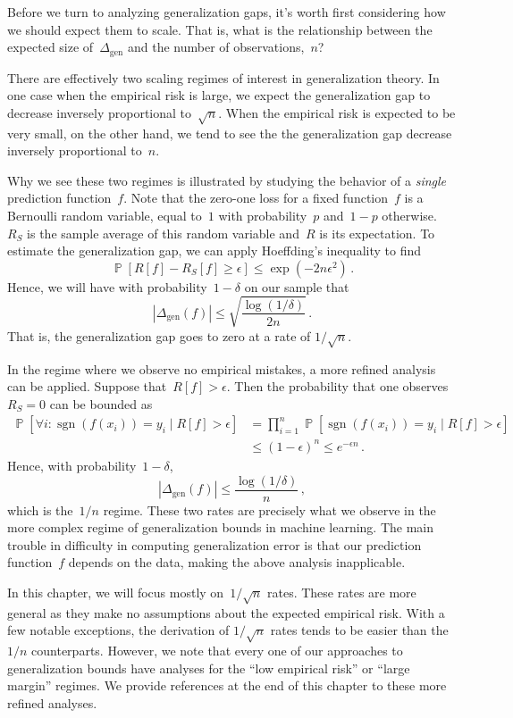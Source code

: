 \documentclass{tufte-book}
\begin{document}
Before we turn to analyzing generalization gaps, it's worth first
considering how we should expect them to scale. That is, what is the
relationship between the expected size of~\(\Delta_{\mathrm{gen}}\) and
the number of observations,~\(n\)?

There are effectively two scaling regimes of interest in generalization
theory. In one case when the empirical risk is large, we expect the
generalization gap to decrease inversely proportional to~\(\sqrt{n}\).
When the empirical risk is expected to be very small, on the other hand,
we tend to see the the generalization gap decrease inversely
proportional to~\(n\).

Why we see these two regimes is illustrated by studying the behavior of
a \emph{single} prediction function~\(f\). Note that the zero-one loss
for a fixed function~\(f\) is a Bernoulli random variable, equal
to~\(1\) with probability~\(p\) and~\(1-p\) otherwise.~\(R_S\) is the
sample average of this random variable and~\(R\) is its expectation. To
estimate the generalization gap, we can apply Hoeffding's inequality to
find\\
\[
  \mathop\mathbb{P}[ R[f]-R_S[f] \geq \epsilon] \leq \exp\left( -2n\epsilon^2\right)\,.
\] Hence, we will have with probability~\(1-\delta\) on our sample that
\[
  |\Delta_{\mathrm{gen}}(f)| \leq \sqrt{\frac{\log(1/\delta)}{2n}}\,.
\] That is, the generalization gap goes to zero at a rate of
\(1/\sqrt{n}\).

In the regime where we observe no empirical mistakes, a more refined
analysis can be applied. Suppose that~\(R[f]>\epsilon\). Then the
probability that one observes~\(R_S=0\) can be bounded as \[
\begin{aligned}
  \mathop\mathbb{P}[ \forall i\colon\operatorname{sgn}(f(x_i))=y_i \mid R[f] > \epsilon]
  &= \prod_{i=1}^n \mathop\mathbb{P}[ \operatorname{sgn}(f(x_i))=y_i \mid R[f] > \epsilon] \\
  & \leq (1-\epsilon)^n \leq e^{-\epsilon n}\,.
  \end{aligned}
\] Hence, with probability~\(1-\delta\), \[
  |\Delta_{\mathrm{gen}}(f)| \leq \frac{\log(1/\delta)}{n}\,,  
\] which is the~\(1/n\) regime. These two rates are precisely what we
observe in the more complex regime of generalization bounds in machine
learning. The main trouble in difficulty in computing generalization
error is that our prediction function~\(f\) depends on the data, making
the above analysis inapplicable.

In this chapter, we will focus mostly on~\(1/\sqrt{n}\) rates. These
rates are more general as they make no assumptions about the expected
empirical risk. With a few notable exceptions, the derivation of
\(1/\sqrt{n}\) rates tends to be easier than the~\(1/n\) counterparts.
However, we note that every one of our approaches to generalization
bounds have analyses for the ``low empirical risk'' or ``large margin''
regimes. We provide references at the end of this chapter to these more
refined analyses.
\end{document}
